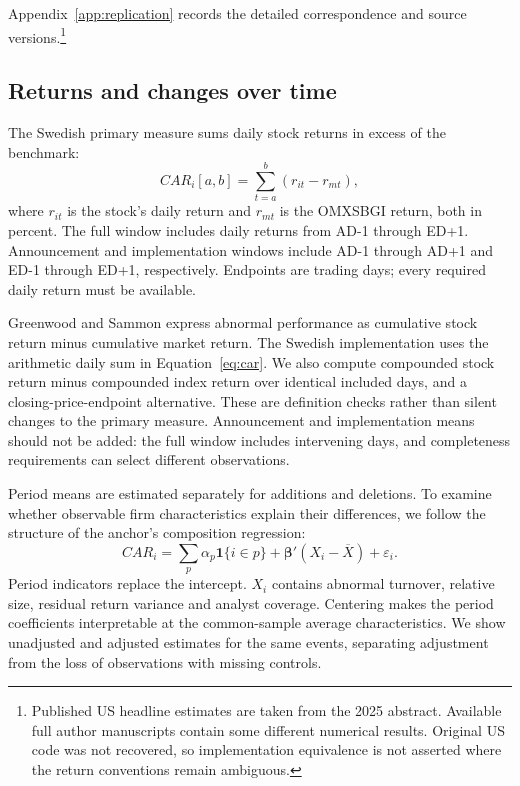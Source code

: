 Appendix~\ref{app:replication} records the detailed correspondence and source versions.\footnote{Published US headline estimates are taken from the 2025 abstract. Available full author manuscripts contain some different numerical results. Original US code was not recovered, so implementation equivalence is not asserted where the return conventions remain ambiguous.}

\subsection{Returns and changes over time}

The Swedish primary measure sums daily stock returns in excess of the benchmark:
\begin{equation}
 CAR_i[a,b]=\sum_{t=a}^{b}(r_{it}-r_{mt}),
 \label{eq:car}
\end{equation}
where $r_{it}$ is the stock's daily return and $r_{mt}$ is the OMXSBGI return, both in percent. The full window includes daily returns from AD-1 through ED+1. Announcement and implementation windows include AD-1 through AD+1 and ED-1 through ED+1, respectively. Endpoints are trading days; every required daily return must be available.

Greenwood and Sammon express abnormal performance as cumulative stock return minus cumulative market return. The Swedish implementation uses the arithmetic daily sum in Equation~\eqref{eq:car}. We also compute compounded stock return minus compounded index return over identical included days, and a closing-price-endpoint alternative. These are definition checks rather than silent changes to the primary measure. Announcement and implementation means should not be added: the full window includes intervening days, and completeness requirements can select different observations.

Period means are estimated separately for additions and deletions. To examine whether observable firm characteristics explain their differences, we follow the structure of the anchor's composition regression:
\begin{equation}
 CAR_i=\sum_p\alpha_p\mathbf{1}\{i\in p\}
       +\boldsymbol{\beta}'(X_i-\overline X)+\varepsilon_i.
 \label{eq:composition}
\end{equation}
Period indicators replace the intercept. $X_i$ contains abnormal turnover, relative size, residual return variance and analyst coverage. Centering makes the period coefficients interpretable at the common-sample average characteristics. We show unadjusted and adjusted estimates for the same events, separating adjustment from the loss of observations with missing controls.

